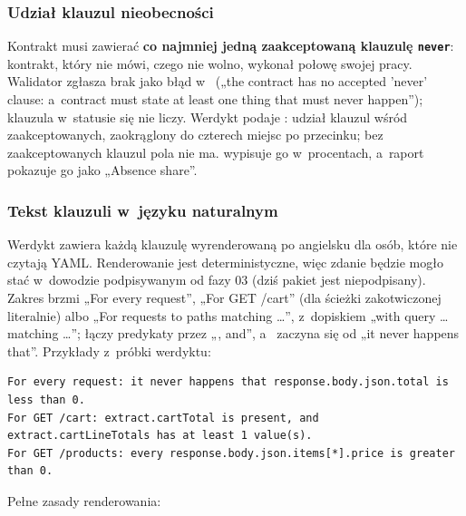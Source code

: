 \subsubsection{Udział klauzul nieobecności}

Kontrakt musi zawierać \textbf{co najmniej jedną zaakceptowaną klauzulę \texttt{never}}:
kontrakt, który nie mówi, czego nie wolno, wykonał połowę swojej pracy. Walidator zgłasza
brak jako błąd w~ („the contract has no accepted 'never' clause: a~contract
must state at least one thing that must never happen”); klauzula  w~statusie
 się nie liczy. Werdykt podaje : udział klauzul
 wśród zaakceptowanych, zaokrąglony do czterech miejsc po przecinku; bez
zaakceptowanych klauzul pola nie ma.  wypisuje go w~procentach, a~raport
pokazuje go jako „Absence share”.

\subsubsection{Tekst klauzuli w~języku naturalnym}

Werdykt zawiera każdą klauzulę wyrenderowaną po angielsku dla osób, które nie czytają YAML.
Renderowanie jest deterministyczne, więc zdanie będzie mogło stać w~dowodzie podpisywanym od fazy 03
(dziś pakiet jest niepodpisany). Zakres
brzmi „For every request”, „For GET /cart” (dla ścieżki zakotwiczonej literalnie) albo „For
requests to paths matching …”, z~dopiskiem „with query … matching …”;  łączy
predykaty przez „, and”, a~ zaczyna się od „it never happens that”. Przykłady
z~próbki werdyktu:

\begin{lstlisting}
For every request: it never happens that response.body.json.total is less than 0.
For GET /cart: extract.cartTotal is present, and extract.cartLineTotals has at least 1 value(s).
For GET /products: every response.body.json.items[*].price is greater than 0.
\end{lstlisting}

Pełne zasady renderowania:

